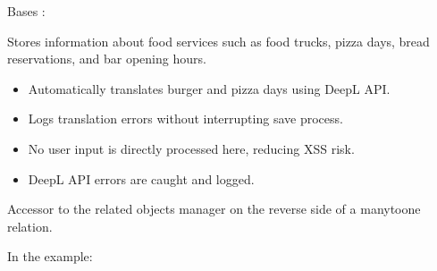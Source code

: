 \documentclass[letterpaper,10pt,french]{sphinxmanual}
\begin{document}
\begin{fulllineitems}
\label{\detokenize{index:core.models.FoodInfo}}
\pysigstartsignatures
\pysiglinewithargsret
{}
{\sphinxparamcomma {}}
{}
\pysigstopsignatures
\sphinxAtStartPar
Bases : 

\sphinxAtStartPar
Stores information about food services such as food trucks, pizza days,
bread reservations, and bar opening hours.
\begin{description}
\begin{itemize}
\item {} 
\sphinxAtStartPar
Automatically translates burger and pizza days using DeepL API.

\item {} 
\sphinxAtStartPar
Logs translation errors without interrupting save process.

\end{itemize}

\begin{itemize}
\item {} 
\sphinxAtStartPar
No user input is directly processed here, reducing XSS risk.

\item {} 
\sphinxAtStartPar
DeepL API errors are caught and logged.

\end{itemize}

\end{description}

\begin{fulllineitems}
\label{\detokenize{index:core.models.FoodInfo.translations}}
\pysigstartsignatures
\pysigline
{}
\pysigstopsignatures
\sphinxAtStartPar
Accessor to the related objects manager on the reverse side of a
many\sphinxhyphen{}to\sphinxhyphen{}one relation.

\sphinxAtStartPar
In the example:

\begin{sphinxVerbatim}[commandchars=\\\{\}]
       
\end{sphinxVerbatim}


\end{fulllineitems}
\end{fulllineitems}
\end{document}
